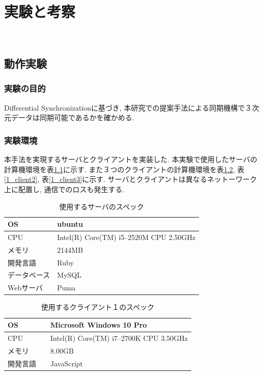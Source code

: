 \chapter{実験と考察}　\label{chap:test}
\section{動作実験}
\subsection{実験の目的}
Differential Synchronizationに基づき, 本研究での提案手法による同期機構で３次元データは同期可能であるかを確かめる.
\subsection{実験環境}
本手法を実現するサーバとクライアントを実装した. 本実験で使用したサーバの計算機環境を表\ref{1_server}に示す. また３つのクライアントの計算機環境を表\ref{1_client1}, 表\ref{1_client2}, 表\ref{1_client3}に示す.
サーバとクライアントは異なるネットーワーク上に配置し, 通信でのロスも発生する.
\begin{table}[]
\begin{center}
	\caption{使用するサーバのスペック}
	\begin{tabular}{|l|l|} \hline
		OS & ubuntu \\ \hline
		CPU &  Intel(R) Core(TM) i5--2520M CPU 2.50GHz\\ \hline
		メモリ & 2144MB \\ \hline
    開発言語　& Ruby \\ \hline
		データベース & MySQL \\ \hline
		Webサーバ & Puma\\ \hline
	\end{tabular}
	\label{1_server}
\end{center}
\end{table}
\begin{table}[]
\begin{center}
	\caption{使用するクライアント１のスペック}
	\begin{tabular}{|l|l|} \hline
		OS & Microsoft Windows 10 Pro \\ \hline
		CPU & Intel(R) Core(TM) i7--2700K CPU 3.50GHz \\ \hline
		メモリ & 8.00GB \\ \hline
    開発言語　& JavaScript \\ \hline
	\end{tabular}
	\label{1_client1}
\end{center}
\end{table}

